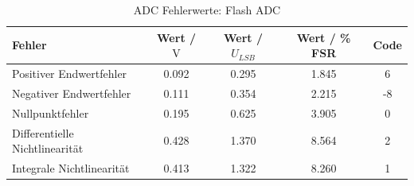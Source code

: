 \begin{table}[htbp]
\centering
\caption{ADC Fehlerwerte: Flash ADC}
\label{tab:flash_adc_errors}
\begin{tabular}{lcccc}
Fehler & Wert / $\si{\volt}$ & Wert / $U_{LSB}$ & Wert / \% FSR & Code \\
\midrule
{\cellcolor[HTML]{FF8438} Positiver Endwertfehler} & 0.092 & 0.295 & 1.845 & 6 \\
{\cellcolor[HTML]{35CCFF} Negativer Endwertfehler} & 0.111 & 0.354 & 2.215 & -8 \\
{\cellcolor[HTML]{8FFF5B} Nullpunktfehler} & 0.195 & 0.625 & 3.905 & 0 \\
{\cellcolor[HTML]{FFEC21} Differentielle Nichtlinearität} & 0.428 & 1.370 & 8.564 & 2 \\
{\cellcolor[HTML]{FF728A} Integrale Nichtlinearität} & 0.413 & 1.322 & 8.260 & 1 \\
\end{tabular}
\end{table}
